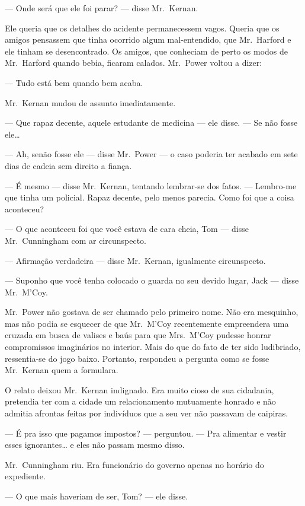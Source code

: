--- Onde será que ele foi parar? --- disse Mr.~Kernan.

Ele queria que os detalhes do acidente permanecessem vagos.  Queria que os
amigos pensassem que tinha ocorrido algum mal-entendido, que Mr.~Harford e ele
tinham se desencontrado.  Os amigos, que conheciam de perto os modos de 
Mr.~Harford quando bebia, ficaram calados.  Mr.~Power voltou a dizer:

--- Tudo está bem quando bem acaba.

Mr.~Kernan mudou de assunto imediatamente.

--- Que rapaz decente, aquele estudante de medicina --- ele disse.  --- Se não
fosse ele\ldots{}

--- Ah, senão fosse ele --- disse Mr.~Power --- o caso poderia ter acabado em
sete dias de cadeia sem direito a fiança.

--- É mesmo --- disse Mr.~Kernan, tentando lembrar-se dos fatos.  --- Lembro-me
que tinha um policial.  Rapaz decente, pelo menos parecia.  Como foi que a
coisa aconteceu?

--- O que aconteceu foi que você estava de cara cheia, Tom --- disse 
Mr.~Cunningham com ar circunspecto.

--- Afirmação verdadeira --- disse Mr.~Kernan, igualmente circunspecto.

--- Suponho que você tenha colocado o guarda no seu devido lugar, Jack ---
disse Mr.~M’Coy.

Mr.~Power não gostava de ser chamado pelo primeiro nome.  Não era mesquinho,
mas não podia se esquecer de que Mr.~M’Coy recentemente empreendera uma cruzada
em busca de valises e baús para que Mrs.~M’Coy pudesse honrar compromissos
imaginários no interior.  Mais do que do fato de ter sido ludibriado,
ressentia-se do jogo baixo.  Portanto, respondeu a pergunta como se fosse 
Mr.~Kernan quem a formulara.

O relato deixou Mr.~Kernan indignado.  Era muito cioso de sua cidadania,
pretendia ter com a cidade um relacionamento mutuamente honrado e não admitia
afrontas feitas por indivíduos que a seu ver não passavam de caipiras.

--- É pra isso que pagamos impostos? --- perguntou.  --- Pra alimentar e vestir
esses ignorantes\ldots{} e eles não passam mesmo disso.

Mr.~Cunningham riu.  Era funcionário do governo apenas no horário do
expediente.

--- O que mais haveriam de ser, Tom? --- ele disse.

